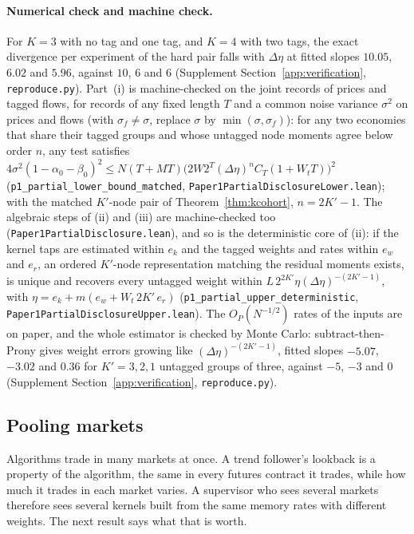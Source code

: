 \documentclass[12pt]{article}
\theoremstyle{definition}
\theoremstyle{remark}
\begin{document}
\paragraph{Numerical check and machine check.} For $K=3$ with no tag and one tag, and $K=4$ with two tags, the exact divergence per experiment of the hard pair falls with $\Delta\eta$ at fitted slopes $10.05$, $6.02$ and $5.96$, against $10$, $6$ and $6$ (Supplement Section~\ref{app:verification}, \nolinkurl{reproduce.py}). Part~(i) is machine-checked on the joint records of prices and tagged flows, for records of any fixed length $T$ and a common noise variance $\sigma^2$ on prices and flows (with $\sigma_f\ne\sigma$, replace $\sigma$ by $\min(\sigma,\sigma_f)$): for any two economies that share their tagged groups and whose untagged node moments agree below order $n$, any test satisfies $4\sigma^2(1-\alpha_0-\beta_0)^2\le N(T+MT)\bigl(2W2^T(\Delta\eta)^nC_T(1+W_tT)\bigr)^2$ (\texttt{p1\_partial\_lower\_bound\_matched}, \nolinkurl{Paper1PartialDisclosureLower.lean}); with the matched $K'$-node pair of Theorem~\ref{thm:kcohort}, $n=2K'-1$. The algebraic steps of (ii) and (iii) are machine-checked too (\nolinkurl{Paper1PartialDisclosure.lean}), and so is the deterministic core of (ii): if the kernel taps are estimated within $e_k$ and the tagged weights and rates within $e_w$ and $e_r$, an ordered $K'$-node representation matching the residual moments exists, is unique and recovers every untagged weight within $L\,2^{2K'}\eta(\Delta\eta)^{-(2K'-1)}$, with $\eta=e_k+m(e_w+W_t\,2K'\,e_r)$ (\texttt{p1\_partial\_upper\_deterministic}, \nolinkurl{Paper1PartialDisclosureUpper.lean}). The $O_P(N^{-1/2})$ rates of the inputs are on paper, and the whole estimator is checked by Monte Carlo: subtract-then-Prony gives weight errors growing like $(\Delta\eta)^{-(2K'-1)}$, fitted slopes $-5.07$, $-3.02$ and $0.36$ for $K'=3,2,1$ untagged groups of three, against $-5$, $-3$ and $0$ (Supplement Section~\ref{app:verification}, \nolinkurl{reproduce.py}).

\subsection{Pooling markets}\label{sec:pool}

Algorithms trade in many markets at once. A trend follower's lookback is a property of the algorithm, the same in every futures contract it trades, while how much it trades in each market varies. A supervisor who sees several markets therefore sees several kernels built from the same memory rates with different weights. The next result says what that is worth.
\end{document}
